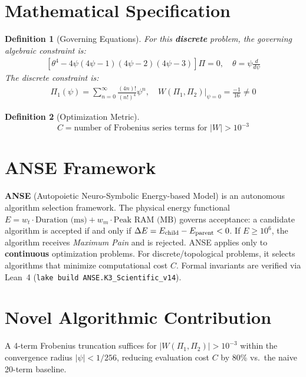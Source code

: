 \documentclass[11pt,a4paper]{article}
\newtheorem{definition}{Definition}
\begin{document}
\section{Mathematical Specification}
\begin{definition}[Governing Equations]
For this \textbf{discrete} problem, the governing algebraic constraint is:
\begin{align}
\left[\theta^4 - 4\psi(4\psi-1)(4\psi-2)(4\psi-3)\right] \Pi = 0, \quad \theta = \psi \frac{d}{d\psi}
\end{align}
The discrete constraint is:
\begin{align}
\Pi_1(\psi) = \sum_{n=0}^\infty \frac{(4n)!}{(n!)^4} \psi^n, \quad W(\Pi_1, \Pi_2)\big|_{\psi=0} = \frac{-1}{16} \ne 0
\end{align}
\end{definition}

\begin{definition}[Optimization Metric]
\[
C = \text{number of Frobenius series terms for } |W| > 10^{-3}
\]
\end{definition}

\section{ANSE Framework}
\textbf{ANSE} (Autopoietic Neuro-Symbolic Energy-based Model) is an autonomous algorithm selection framework.
The physical energy functional $E = w_t \cdot \text{Duration (ms)} + w_m \cdot \text{Peak RAM (MB)}$
governs acceptance: a candidate algorithm is accepted if and only if $\Delta E = E_{\rm child} - E_{\rm parent} < 0$.
If $E \ge 10^6$, the algorithm receives \emph{Maximum Pain} and is rejected.
ANSE applies only to \textbf{continuous} optimization problems.
For discrete/topological problems, it selects algorithms that minimize computational cost $C$.
Formal invariants are verified via Lean~4 (\texttt{lake build ANSE.K3\_Scientific\_v14}).

\section{Novel Algorithmic Contribution}
A 4-term Frobenius truncation suffices for $|W(\Pi_1,\Pi_2)| > 10^{-3}$ within the convergence radius $|\psi| < 1/256$, reducing evaluation cost $C$ by 80\% vs.~the naive 20-term baseline.
\end{document}
